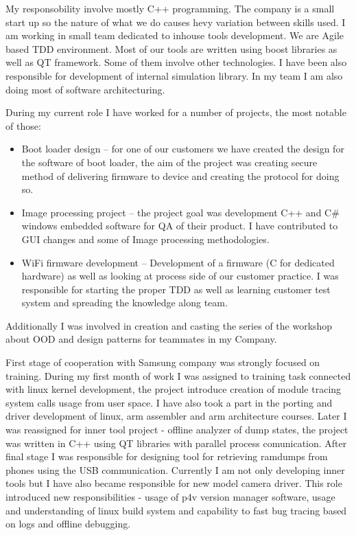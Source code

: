 \documentclass[8pt,a4paper]{moderncv}
\begin{document}
\vspace{4mm}
My responsobility involve mostly C++ programming. The company is a small start up so the nature of what we do causes hevy variation between skills used.
I am working in small team dedicated to inhouse tools development. We are Agile based TDD environment.
Most of our tools are written using boost libraries as well as QT framework. Some of them involve other technologies.
I have been also responsible for development of internal simulation library. In my team I am also doing most of software architecturing.
\cvline{}{}

\vspace{4mm}
During my current role I have worked for a number of projects, the most notable of those:
\begin{itemize}
\item Boot loader design – for one of our customers we have created the design for the software of boot loader, the aim of the project was creating secure method of delivering firmware to device and creating the protocol for doing so.
\item Image processing project – the project goal was development C++ and C\# windows embedded software for QA of their product. I have contributed to GUI changes and some of Image processing methodologies.
\item WiFi firmware development – Development of a firmware (C for dedicated hardware) as well as looking at process side of our customer practice. I was responsible for starting the proper TDD as well as learning customer test system and spreading the knowledge along team.
\end{itemize}
Additionally I was involved in creation and casting the series of the workshop about OOD and design patterns for teammates in my Company.
\cvline{}{}

\vspace{4mm}
First stage of cooperation with Samsung company was strongly focused on training. During my first month of work I was assigned
to training task connected with linux kernel development, the project introduce creation of module tracing system calls usage from user space.
I have also took a part in the porting and driver development of linux, arm assembler and arm architecture courses.
Later I was reassigned for inner tool project - offline analyzer of dump states, the project was written in C++ using QT libraries
with parallel process comunication. After final stage I was responsible for designing tool for retrieving ramdumps from phones using
the USB communication. Currently I am not only developing inner tools but I have also became responsible for new model camera driver.
This role introduced new responsibilities - usage of p4v version manager software, usage and understanding of linux build system and
capability to fast bug tracing based on logs and offline debugging.
\cvline{}{}
\end{document}
